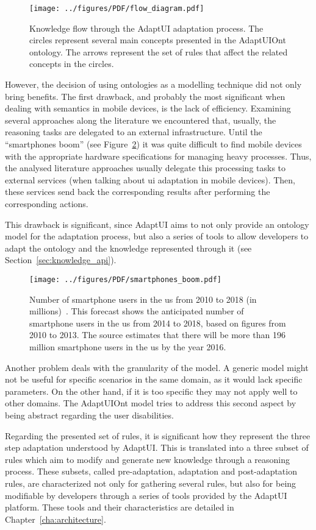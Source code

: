 \begin{figure}
\centering
\texttt{[image: ../figures/PDF/flow\_diagram.pdf]}
\caption{Knowledge flow through the AdaptUI adaptation process. The circles
represent several main concepts presented in the AdaptUIOnt ontology. The arrows
represent the set of rules that affect the related concepts in the circles.}
\label{fig:flow_diagram_2}
\end{figure}

However, the decision of using ontologies as a modelling technique did not only
bring benefits. The first drawback, and probably the most significant when dealing
with semantics in mobile devices, is the lack of efficiency. Examining several
approaches along the literature we encountered that, usually, the reasoning tasks
are delegated to an external infrastructure. Until the ``smartphones boom'' (see
Figure~\ref{fig:smartphones_boom}) it was quite difficult to find mobile devices
with the appropriate hardware specifications for managing heavy processes. Thus,
the analysed literature approaches usually delegate this processing tasks to
external services (when talking about \acs{ui} adaptation in mobile devices). Then,
these services send back the corresponding results after performing the
corresponding actions. 

This drawback is significant, since AdaptUI aims to not only provide an ontology
model for the adaptation process, but also a series of tools to allow developers
to adapt the ontology and the knowledge represented through it (see 
Section~\ref{sec:knowledge_api}).


\begin{figure}
\centering
\texttt{[image: ../figures/PDF/smartphones\_boom.pdf]}
\caption{Number of smartphone users in the \ac{us} from 2010 to 2018 (in
millions)~\citep{smartphones_boom}. This forecast shows the anticipated number
of smartphone users in the \ac{us} from 2014 to 2018, based on figures from 2010 
to 2013. The source estimates that there will be more than 196 million smartphone
users in the \ac{us} by the year 2016.}
\label{fig:smartphones_boom}
\end{figure}

Another problem deals with the granularity of the model. A generic model might
not be useful for specific scenarios in the same domain, as it would lack specific
parameters. On the other hand, if it is too specific they may not apply well to
other domains. The AdaptUIOnt model tries to address this second aspect by being
abstract regarding the user disabilities. 

Regarding the presented set of rules, it is significant how they represent the
three step adaptation understood by AdaptUI. This is translated into a three
subset of rules which aim to modify and generate new knowledge through a reasoning
process. These subsets, called pre-adaptation, adaptation and post-adaptation rules,
are characterized not only for gathering several rules, but also for being modifiable
by developers through a series of tools provided by the AdaptUI platform. These
tools and their characteristics are detailed in Chapter~\ref{cha:architecture}.